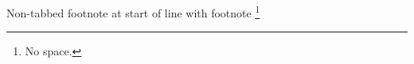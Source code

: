 \documentclass{article}
\begin{document}
Non-tabbed footnote at start of line with footnote%
\footnote{No space.}
\end{document}
